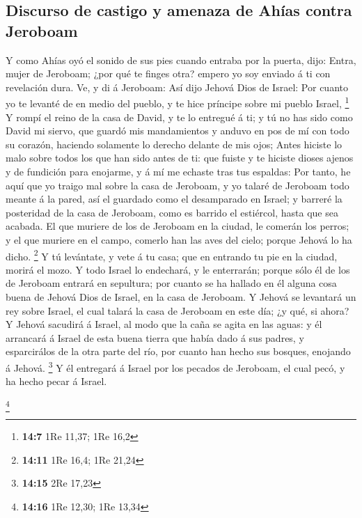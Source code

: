 \hypertarget{discurso-de-castigo-y-amenaza-de-ahuxedas-contra-jeroboam}{%
\subsection{Discurso de castigo y amenaza de Ahías contra
Jeroboam}\label{discurso-de-castigo-y-amenaza-de-ahuxedas-contra-jeroboam}}

 Y como Ahías oyó el sonido de sus pies cuando entraba por
la puerta, dijo: Entra, mujer de Jeroboam; ¿por qué te finges otra?
empero yo soy enviado á ti con revelación dura.  Ve, y di á
Jeroboam: Así dijo Jehová Dios de Israel: Por cuanto yo te levanté de en
medio del pueblo, y te hice príncipe sobre mi pueblo Israel, \footnote{\textbf{14:7}
  1Re 11,37; 1Re 16,2}  Y rompí el reino de la casa de
David, y te lo entregué á ti; y tú no has sido como David mi siervo, que
guardó mis mandamientos y anduvo en pos de mí con todo su corazón,
haciendo solamente lo derecho delante de mis ojos;  Antes
hiciste lo malo sobre todos los que han sido antes de ti: que fuiste y
te hiciste dioses ajenos y de fundición para enojarme, y á mí me echaste
tras tus espaldas:  Por tanto, he aquí que yo traigo mal
sobre la casa de Jeroboam, y yo talaré de Jeroboam todo meante á la
pared, así el guardado como el desamparado en Israel; y barreré la
posteridad de la casa de Jeroboam, como es barrido el estiércol, hasta
que sea acabada.  El que muriere de los de Jeroboam en la
ciudad, le comerán los perros; y el que muriere en el campo, comerlo han
las aves del cielo; porque Jehová lo ha dicho. \footnote{\textbf{14:11}
  1Re 16,4; 1Re 21,24}  Y tú levántate, y vete á tu casa;
que en entrando tu pie en la ciudad, morirá el mozo.  Y
todo Israel lo endechará, y le enterrarán; porque sólo él de los de
Jeroboam entrará en sepultura; por cuanto se ha hallado en él alguna
cosa buena de Jehová Dios de Israel, en la casa de Jeroboam.
 Y Jehová se levantará un rey sobre Israel, el cual talará
la casa de Jeroboam en este día; ¿y qué, si ahora?  Y
Jehová sacudirá á Israel, al modo que la caña se agita en las aguas: y
él arrancará á Israel de esta buena tierra que había dado á sus padres,
y esparcirálos de la otra parte del río, por cuanto han hecho sus
bosques, enojando á Jehová. \footnote{\textbf{14:15} 2Re 17,23}
 Y él entregará á Israel por los pecados de Jeroboam, el
cual pecó, y ha hecho pecar á Israel.

\footnote{\textbf{14:16} 1Re 12,30; 1Re 13,34}

